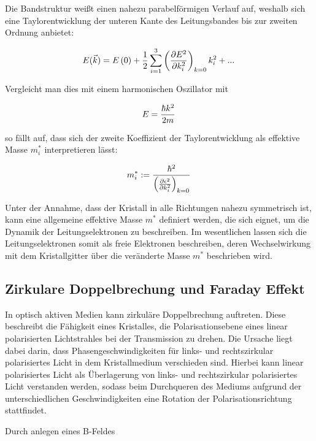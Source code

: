 Die Bandstruktur weißt einen nahezu parabelförmigen Verlauf auf, weshalb sich eine Taylorentwicklung der unteren Kante des
Leitungsbandes bis zur zweiten Ordnung anbietet:

\begin{equation}
    E(\vec{k})=E\left(0\right)+\frac{1}{2}\sum_{i=1}^3\left(\frac{\partial E^2}{\partial k_i^2}\right)_{k=0}k_i^2+...\,
    \notag
\end{equation}
 
Vergleicht man dies mit einem harmonischen Oszillator mit

\begin{equation}
    E=\frac{\hbar k^2}{2m}\,
    \notag
\end{equation}

so fällt auf, dass sich der zweite Koeffizient der Taylorentwicklung als effektive Masse $m_i^*$ interpretieren lässt:
    
\begin{equation}
    m_i^*:=\frac{\hbar^2}{\left(\frac{\partial\epsilon^2}{\partial k_i^2}\right)_{k=0}}\,
    \notag
\end{equation}

Unter der Annahme, dass der Kristall in alle Richtungen nahezu symmetrisch ist, kann eine allgemeine effektive Masse
$m^*$ definiert werden, die sich eignet, um die Dynamik der Leitungselektronen zu beschreiben. Im wesentlichen
lassen sich die Leitungselektronen somit als freie Elektronen beschreiben, deren Wechselwirkung mit dem Kristallgitter
über die veränderte Masse $m^*$ beschrieben wird.

\subsection{Zirkulare Doppelbrechung und Faraday Effekt}

In optisch aktiven Medien kann zirkuläre Doppelbrechung auftreten. Diese beschreibt die
Fähigkeit eines Kristalles, die Polarisationsebene eines linear polarisierten Lichtstrahles bei der Transmission zu drehen.
Die Ursache liegt dabei darin, dass Phasengeschwindigkeiten für links- und rechtszirkular polarisiertes Licht in dem Kristallmedium verschieden sind.
Hierbei kann linear polarisiertes Licht als Überlagerung von links- und rechtszirkular polarisiertes Licht verstanden werden, sodass
beim Durchqueren des Mediums aufgrund der unterschiedlichen Geschwindigkeiten eine Rotation der Polarisationsrichtung stattfindet. \cite{V46Anhang}

Durch anlegen eines B-Feldes  